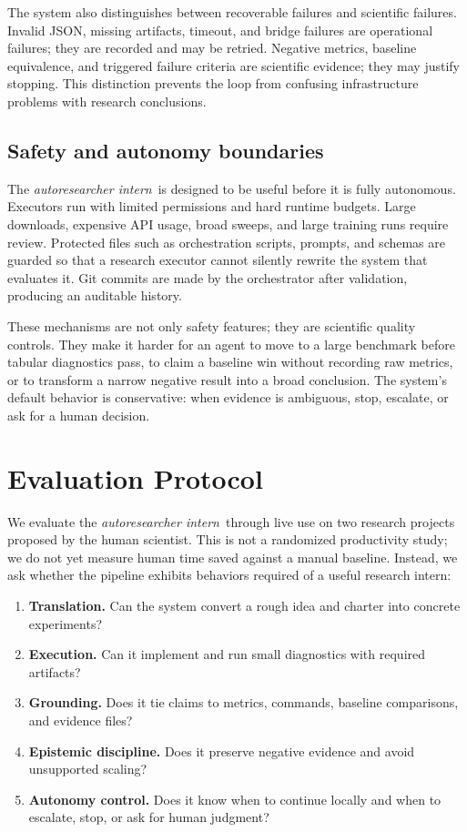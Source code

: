 \documentclass{article}
\newcommand{\intern}{\emph{autoresearcher intern}}
\begin{document}
The system also distinguishes between recoverable failures and scientific failures. Invalid JSON, missing artifacts, timeout, and bridge failures are operational failures; they are recorded and may be retried. Negative metrics, baseline equivalence, and triggered failure criteria are scientific evidence; they may justify stopping. This distinction prevents the loop from confusing infrastructure problems with research conclusions.

\subsection{Safety and autonomy boundaries}

The \intern\ is designed to be useful before it is fully autonomous. Executors run with limited permissions and hard runtime budgets. Large downloads, expensive API usage, broad sweeps, and large training runs require review. Protected files such as orchestration scripts, prompts, and schemas are guarded so that a research executor cannot silently rewrite the system that evaluates it. Git commits are made by the orchestrator after validation, producing an auditable history.

These mechanisms are not only safety features; they are scientific quality controls. They make it harder for an agent to move to a large benchmark before tabular diagnostics pass, to claim a baseline win without recording raw metrics, or to transform a narrow negative result into a broad conclusion. The system's default behavior is conservative: when evidence is ambiguous, stop, escalate, or ask for a human decision.

\section{Evaluation Protocol}

We evaluate the \intern\ through live use on two research projects proposed by the human scientist. This is not a randomized productivity study; we do not yet measure human time saved against a manual baseline. Instead, we ask whether the pipeline exhibits behaviors required of a useful research intern:

\begin{enumerate}[leftmargin=*]
    \item \textbf{Translation.} Can the system convert a rough idea and charter into concrete experiments?
    \item \textbf{Execution.} Can it implement and run small diagnostics with required artifacts?
    \item \textbf{Grounding.} Does it tie claims to metrics, commands, baseline comparisons, and evidence files?
    \item \textbf{Epistemic discipline.} Does it preserve negative evidence and avoid unsupported scaling?
    \item \textbf{Autonomy control.} Does it know when to continue locally and when to escalate, stop, or ask for human judgment?
\end{enumerate}
\end{document}
